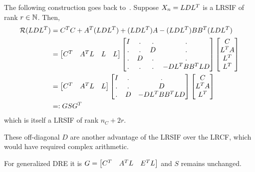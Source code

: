 The following construction goes back to~\cite{Lang2015}.
Suppose $X_n = LDL^T$ is a \ac{LRSIF} of rank $r\in\mathbb{N}$.
Then,
\begin{subequations}
\begin{align}
  \operatorname{\mathcal R}(LDL^T)
  &= C^T C + A^T (LDL^T) + (LDL^T) A - (LDL^T) BB^T (LDL^T) \\
  &= \begin{bmatrix}
    C^T & A^T L & L & L
  \end{bmatrix}
  \begin{bmatrix}
    I & . & . & . \\
    . & . & D & . \\
    . & D & . & . \\
    . & . & . & - DL^T BB^T LD
  \end{bmatrix}
  \begin{bmatrix}
    C \\
    L^T A \\
    L^T \\
    L^T
  \end{bmatrix} \\
  \label{eq:ros:lr-condensed:2}
  &= \begin{bmatrix}
    C^T & A^T L & L
  \end{bmatrix}
  \begin{bmatrix}
    I & . & . \\
    . & . & D \\
    . & D & - DL^T BB^T LD
  \end{bmatrix}
  \begin{bmatrix}
    C \\
    L^T A \\
    L^T
  \end{bmatrix} \\
  &=: GSG^T
\end{align}
\end{subequations}
which is itself a \ac{LRSIF} of rank $n_C + 2r$.

\begin{remark}
  These off-diagonal $D$ are another advantage of the \ac{LRSIF} over the \ac{LRCF},
  which would have required complex arithmetic.
\end{remark}

\begin{remark}
  For generalized \ac{DRE} it is $G = \begin{bmatrix}
    C^T & A^T L & E^T L
  \end{bmatrix}$ and $S$ remains unchanged.
\end{remark}

